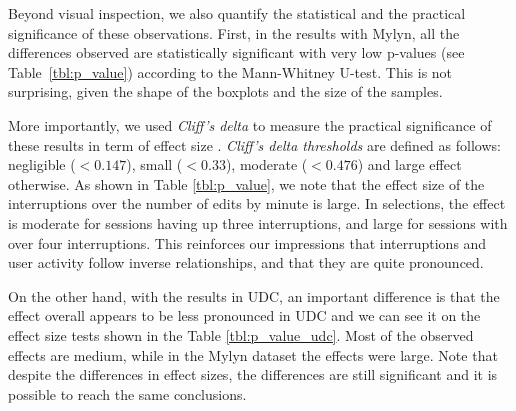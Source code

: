 \documentclass[times]{smrauth}
\begin{document}
Beyond visual inspection, we also quantify the statistical and the practical significance of these observations. First, in the results with Mylyn, all the differences observed are statistically significant with very low p-values (see Table~\ref{tbl:p_value}) according to the Mann-Whitney U-test. This is not surprising, given the shape of the boxplots and the size of the samples.

More importantly, we used \textit{Cliff's delta} to measure the practical significance of these results in term of effect size %
\cite{C94}. \textit{Cliff's delta thresholds} are defined as follows: negligible ($<0.147$), small  ($<0.33$), moderate ($<0.476$) and large effect otherwise. As shown in Table \ref{tbl:p_value}, we note that the effect size of the interruptions over the number of edits by minute is large. In selections, the effect is moderate for sessions having up three interruptions, and large for sessions with over four interruptions. This reinforces our impressions that interruptions and user activity follow inverse relationships, and that they are quite pronounced.

On the other hand, with the results in UDC, an important difference is that the effect overall appears to be less pronounced in UDC and we can see it on the effect size tests shown in the Table \ref{tbl:p_value_udc}. Most of the observed effects are medium, while in the Mylyn dataset the effects were large. Note that despite the differences in effect sizes, the differences are still significant and it is possible to reach the same conclusions.

\end{document}
